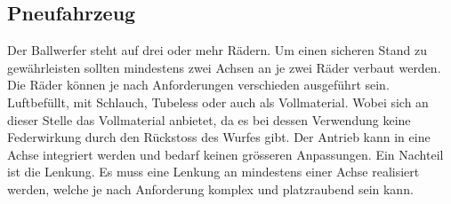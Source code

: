 \subsection{Pneufahrzeug}
Der Ballwerfer steht auf drei oder mehr Rädern. Um einen sicheren Stand zu gewährleisten sollten mindestens zwei Achsen an je zwei Räder verbaut werden. Die Räder können je nach Anforderungen verschieden ausgeführt sein. Luftbefüllt, mit Schlauch, Tubeless oder auch als Vollmaterial. Wobei sich an dieser Stelle das Vollmaterial anbietet, da es bei dessen Verwendung keine Federwirkung durch den Rückstoss des Wurfes gibt. Der Antrieb kann in eine Achse integriert werden und bedarf keinen grösseren Anpassungen. Ein Nachteil ist die Lenkung. Es muss eine Lenkung an mindestens einer Achse realisiert werden, welche je nach Anforderung komplex und platzraubend sein kann.
 

